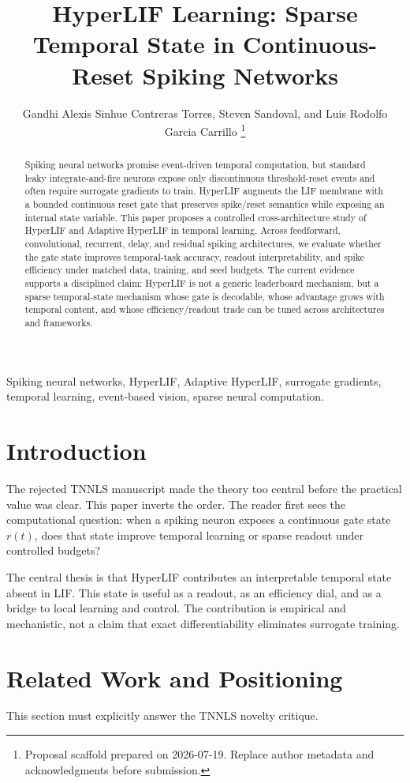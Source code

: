 \documentclass[journal]{IEEEtran}
\title{HyperLIF Learning: Sparse Temporal State in Continuous-Reset Spiking Networks}
\author{Gandhi Alexis Sinhue Contreras Torres, Steven Sandoval, and Luis Rodolfo Garcia Carrillo%
\thanks{Proposal scaffold prepared on 2026-07-19. Replace author metadata and acknowledgments before submission.}}
\begin{document}
\maketitle

\begin{abstract}
Spiking neural networks promise event-driven temporal computation, but standard leaky integrate-and-fire neurons expose only discontinuous threshold-reset events and often require surrogate gradients to train. HyperLIF augments the LIF membrane with a bounded continuous reset gate that preserves spike/reset semantics while exposing an internal state variable. This paper proposes a controlled cross-architecture study of HyperLIF and Adaptive HyperLIF in temporal learning. Across feedforward, convolutional, recurrent, delay, and residual spiking architectures, we evaluate whether the gate state improves temporal-task accuracy, readout interpretability, and spike efficiency under matched data, training, and seed budgets. The current evidence supports a disciplined claim: HyperLIF is not a generic leaderboard mechanism, but a sparse temporal-state mechanism whose gate is decodable, whose advantage grows with temporal content, and whose efficiency/readout trade can be tuned across architectures and frameworks.
\end{abstract}

\begin{IEEEkeywords}
Spiking neural networks, HyperLIF, Adaptive HyperLIF, surrogate gradients, temporal learning, event-based vision, sparse neural computation.
\end{IEEEkeywords}

\section{Introduction}
The rejected TNNLS manuscript made the theory too central before the practical value was clear. This paper inverts the order. The reader first sees the computational question: when a spiking neuron exposes a continuous gate state $r(t)$, does that state improve temporal learning or sparse readout under controlled budgets?

The central thesis is that HyperLIF contributes an interpretable temporal state absent in LIF. This state is useful as a readout, as an efficiency dial, and as a bridge to local learning and control. The contribution is empirical and mechanistic, not a claim that exact differentiability eliminates surrogate training.

\section{Related Work and Positioning}
This section must explicitly answer the TNNLS novelty critique.
\end{document}
